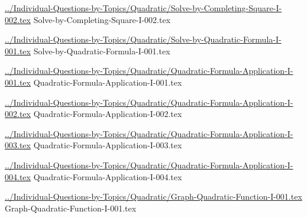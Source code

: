 \documentclass[answer,cancelspace,12pt]{exam}
\begin{document}
\begin{questions}
\question
\href{../Individual-Questions-by-Topics/Quadratic/Solve-by-Completing-Square-I-002.tex}{../Individual-Questions-by-Topics/Quadratic/Solve-by-Completing-Square-I-002.tex}
{Solve-by-Completing-Square-I-002.tex}


\question
\href{../Individual-Questions-by-Topics/Quadratic/Solve-by-Quadratic-Formula-I-001.tex}{../Individual-Questions-by-Topics/Quadratic/Solve-by-Quadratic-Formula-I-001.tex}
{Solve-by-Quadratic-Formula-I-001.tex}

\question
\href{../Individual-Questions-by-Topics/Quadratic/Quadratic-Formula-Application-I-001.tex}{../Individual-Questions-by-Topics/Quadratic/Quadratic-Formula-Application-I-001.tex}
{Quadratic-Formula-Application-I-001.tex}


\question
\href{../Individual-Questions-by-Topics/Quadratic/Quadratic-Formula-Application-I-002.tex}{../Individual-Questions-by-Topics/Quadratic/Quadratic-Formula-Application-I-002.tex}
{Quadratic-Formula-Application-I-002.tex}


\question
\href{../Individual-Questions-by-Topics/Quadratic/Quadratic-Formula-Application-I-003.tex}{../Individual-Questions-by-Topics/Quadratic/Quadratic-Formula-Application-I-003.tex}
{Quadratic-Formula-Application-I-003.tex}


\question
\href{../Individual-Questions-by-Topics/Quadratic/Quadratic-Formula-Application-I-004.tex}{../Individual-Questions-by-Topics/Quadratic/Quadratic-Formula-Application-I-004.tex}
{Quadratic-Formula-Application-I-004.tex}



\question
\href{../Individual-Questions-by-Topics/Quadratic/Graph-Quadratic-Function-I-001.tex}{../Individual-Questions-by-Topics/Quadratic/Graph-Quadratic-Function-I-001.tex}
{Graph-Quadratic-Function-I-001.tex}



\end{questions}
\end{document}
